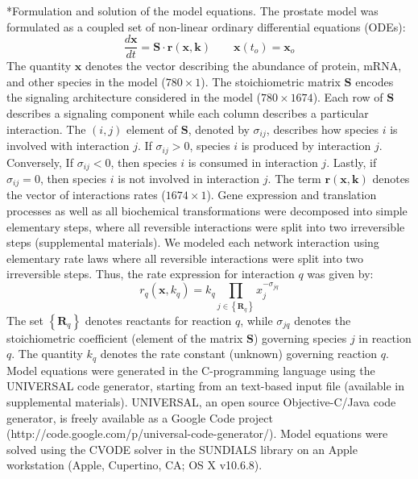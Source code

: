 \documentclass[12pt]{article}
\makeatletter
\renewcommand\subsection{\@startsection
	{subsection}{2}{0mm}
	{-0.05in}
	{-0.5\baselineskip}
	{\normalfont\normalsize\bfseries}}
\makeatother
\begin{document}
\subsection*{Formulation and solution of the model equations.}
The prostate model was formulated as a coupled set of non-linear ordinary differential equations (ODEs):
\begin{equation}\label{asseassertain_massbalance}
\frac{d\mathbf{x}}{dt}=\mathbf{S}\cdot\mathbf{r}\left(\mathbf{x},\mathbf{k}\right)\qquad\mathbf{x}\left(t_{o}\right)=\mathbf{x}_{o}
\end{equation}
The quantity $\mathbf{x}$ denotes the vector describing the abundance of protein, mRNA, and other species in the model ($780\times 1$).
The stoichiometric matrix $\mathbf{S}$ encodes the signaling architecture considered in the model ($780\times 1674$).  
Each row of $\mathbf{S}$ describes a signaling component while each column describes a particular interaction.
The $(i,j)$ element of $\mathbf{S}$, denoted by $\sigma_{ij}$, describes how species $i$ is involved with interaction $j$. 
If $\sigma_{ij}>0$, species $i$ is produced by interaction $j$. Conversely, If $\sigma_{ij}<0$, then species $i$ is consumed in interaction $j$. 
Lastly, if $\sigma_{ij}=0$, then species $i$ is not involved in interaction $j$.
The term  $\mathbf{r}\left(\mathbf{x},\mathbf{k}\right)$ denotes the vector of interactions rates ($1674\times{1}$).
Gene expression and translation processes as well as all biochemical transformations were decomposed into simple elementary steps, 
where all reversible interactions were split into two irreversible steps (supplemental materials). 
We modeled each network interaction using elementary rate laws where all reversible interactions were split into two irreversible steps. 
Thus, the rate expression for interaction $q$ was given by:
\begin{equation}\label{eq-mass-action}
r_{q}\left(\mathbf{x},k_{q}\right)=k_{q}\prod_{j\in\left\{\mathbf{R}_{q}\right\}}x_{j}^{-\sigma_{jq}}
\end{equation}
The set $\left\{\mathbf{R}_{q}\right\}$ denotes reactants for reaction $q$, while $\sigma_{jq}$ denotes the stoichiometric coefficient (element of the matrix $\mathbf{S}$) governing species $j$ in reaction $q$. The quantity $k_{q}$ denotes the rate constant (unknown) governing reaction $q$.
Model equations were generated in the C-programming language using the UNIVERSAL code generator, starting from an text-based input file (available in supplemental materials). 
UNIVERSAL, an open source Objective-C/Java code generator, is freely available as a Google Code project (http://code.google.com/p/universal-code-generator/). 
Model equations were solved using the CVODE solver in the SUNDIALS library \cite{Hindmarsh2005} on an Apple workstation (Apple, Cupertino, CA; OS X v10.6.8).
\end{document}
